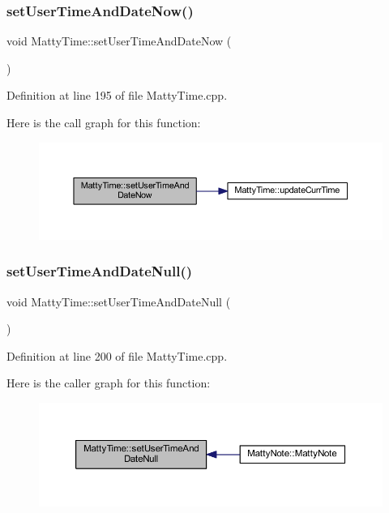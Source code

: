 \subsubsection{\texorpdfstring{set\+User\+Time\+And\+Date\+Now()}{setUserTimeAndDateNow()}}
{\footnotesize\ttfamily void Matty\+Time\+::set\+User\+Time\+And\+Date\+Now (\begin{DoxyParamCaption}{ }\end{DoxyParamCaption})}



Definition at line 195 of file Matty\+Time.\+cpp.

Here is the call graph for this function\+:
\nopagebreak
\begin{figure}[H]
\begin{center}
\leavevmode
\includegraphics[width=350pt]{classMattyTime_afef585f71d11eed7777065af8ca0e9f0_cgraph}
\end{center}
\end{figure}
\hypertarget{classMattyTime_a6ae52c957bcf12e92624e09db890ce21}{}\label{classMattyTime_a6ae52c957bcf12e92624e09db890ce21} 
\subsubsection{\texorpdfstring{set\+User\+Time\+And\+Date\+Null()}{setUserTimeAndDateNull()}}
{\footnotesize\ttfamily void Matty\+Time\+::set\+User\+Time\+And\+Date\+Null (\begin{DoxyParamCaption}{ }\end{DoxyParamCaption})}



Definition at line 200 of file Matty\+Time.\+cpp.

Here is the caller graph for this function\+:
\nopagebreak
\begin{figure}[H]
\begin{center}
\leavevmode
\includegraphics[width=350pt]{classMattyTime_a6ae52c957bcf12e92624e09db890ce21_icgraph}
\end{center}
\end{figure}
\hypertarget{classMattyTime_a52a7500e419fe56d10ddf2715fc96d06}{}\label{classMattyTime_a52a7500e419fe56d10ddf2715fc96d06} 
